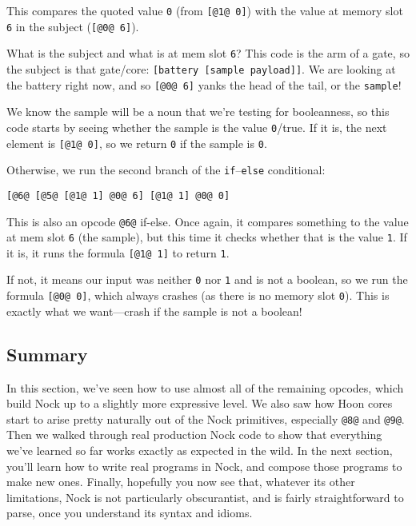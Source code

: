 \documentclass[twoside]{article}
\begin{document}
This compares the quoted value \lstinline[style=inlinecode]{0} (from \lstinline[style=inlinecode]{[@1@ 0]}) with the value at memory slot \lstinline[style=inlinecode]{6} in the subject (\lstinline[style=inlinecode]{[@0@ 6]}).

What is the subject and what is at mem slot \lstinline[style=inlinecode]{6}? This code is the arm of a gate, so the subject is that gate/core: \lstinline[style=inlinecode]{[battery [sample payload]]}. We are looking at the battery right now, and so \lstinline[style=inlinecode]{[@0@ 6]} yanks the head of the tail, or the \lstinline[style=inlinecode]{sample}!

We know the sample will be a noun that we're testing for booleanness, so this code starts by seeing whether the sample is the value \lstinline[style=inlinecode]{0}/true. If it is, the next element is \lstinline[style=inlinecode]{[@1@ 0]}, so we return \lstinline[style=inlinecode]{0} if the sample is \lstinline[style=inlinecode]{0}.

Otherwise, we run the second branch of the \lstinline[style=inlinecode]{if}–\lstinline[style=inlinecode]{else} conditional:

\begin{lstlisting}[style=listingcode]
[@6@ [@5@ [@1@ 1] @0@ 6] [@1@ 1] @0@ 0]
\end{lstlisting}

This is also an opcode \lstinline[style=inlinecode]{@6@} if-else. Once again, it compares something to the value at mem slot \lstinline[style=inlinecode]{6} (the sample), but this time it checks whether that is the value \lstinline[style=inlinecode]{1}. If it is, it runs the formula \lstinline[style=inlinecode]{[@1@ 1]} to return \lstinline[style=inlinecode]{1}.

If not, it means our input was neither \lstinline[style=inlinecode]{0} nor \lstinline[style=inlinecode]{1} and is not a boolean, so we run the formula \lstinline[style=inlinecode]{[@0@ 0]}, which always crashes (as there is no memory slot \lstinline[style=inlinecode]{0}). This is exactly what we want—crash if the sample is not a boolean!

\subsection{Summary}

In this section, we've seen how to use almost all of the remaining opcodes, which build Nock up to a slightly more expressive level. We also saw how Hoon cores start to arise pretty naturally out of the Nock primitives, especially \lstinline[style=inlinecode]{@8@} and \lstinline[style=inlinecode]{@9@}. Then we walked through real production Nock code to show that everything we've learned so far works exactly as expected in the wild.  In the next section, you'll learn how to write real programs in Nock, and compose those programs to make new ones.  Finally, hopefully you now see that, whatever its other limitations, Nock is not particularly obscurantist, and is fairly straightforward to parse, once you understand its syntax and idioms.
\end{document}
